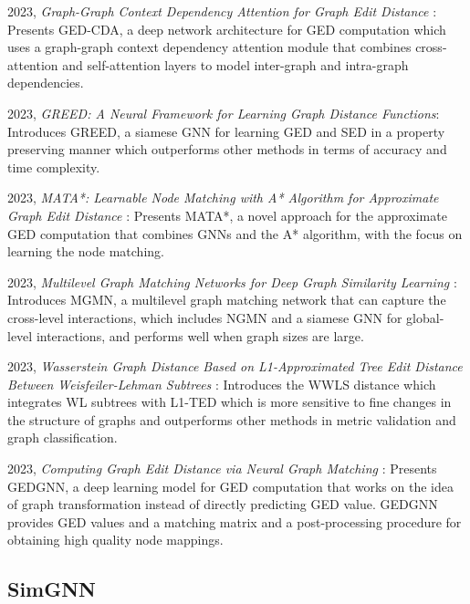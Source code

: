 \documentclass[../Thesis.tex]{subfiles}
\begin{document}
	2023, \textit{Graph-Graph Context Dependency Attention for Graph Edit Distance} \cite{graph_graph_context_dependency_attention_for_graph_edit_distance}: Presents GED-CDA, a deep network architecture for GED computation which uses a graph-graph context dependency attention module that combines cross-attention and self-attention layers to model inter-graph and intra-graph dependencies.
	
	2023, \textit{GREED: A Neural Framework for Learning Graph Distance Functions}: Introduces GREED, a siamese GNN for learning GED and SED in a property preserving manner which outperforms other methods in terms of accuracy and time complexity.
	
	2023, \textit{MATA*: Learnable Node Matching with A* Algorithm for Approximate Graph Edit Distance} \cite{mata_combining_learnable_node_matching_with_a*_algorithm_for_approximate_graph_edit_distance}: Presents MATA*, a novel approach for the approximate GED computation that combines GNNs and the A* algorithm, with the focus on learning the node matching.
	
	2023, \textit{Multilevel Graph Matching Networks for Deep Graph Similarity Learning} \cite{multilevel_graph_matching_networks_for_deep_graph_similarity_learning}: Introduces MGMN, a multilevel graph matching network that can capture the cross-level interactions, which includes NGMN and a siamese GNN for global-level interactions, and performs well when graph sizes are large.
	
	2023, \textit{Wasserstein Graph Distance Based on L1-Approximated Tree Edit Distance Between Weisfeiler-Lehman Subtrees} \cite{wasserstein_graph_distance_based_on_l1_approximated_tree_edit_distance_between_weisfeiler_lehman_subtrees}: Introduces the WWLS distance which integrates WL subtrees with L1-TED which is more sensitive to fine changes in the structure of graphs and outperforms other methods in metric validation and graph classification.
	
	2023, \textit{Computing Graph Edit Distance via Neural Graph Matching} \cite{computing_graph_edit_distance_via_neural_graph_matching}: Presents GEDGNN, a deep learning model for GED computation that works on the idea of graph transformation instead of directly predicting GED value. GEDGNN provides GED values and a matching matrix and a post-processing procedure for obtaining high quality node mappings.
	
	\subsection{SimGNN}
	\label{sec:simgnn}
	
\end{document}
